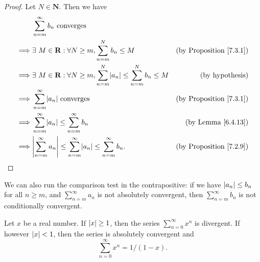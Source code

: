 \begin{proof}
    Let \(N \in \mathbf{N}\).
    Then we have
    \begin{align*}
                 & \sum_{n = m}^\infty b_n \text{ converges}                                                                                                    \\
        \implies & \exists\ M \in \mathbf{R} : \forall N \geq m, \sum_{n = m}^N b_n \leq M                                & \text{(by Proposition \ref{7.3.1})} \\
        \implies & \exists\ M \in \mathbf{R} : \forall N \geq m, \sum_{n = m}^N \abs*{a_n} \leq \sum_{n = m}^N b_n \leq M & \text{(by hypothesis)}              \\
        \implies & \sum_{n = m}^\infty \abs*{a_n} \text{ converges}                                                       & \text{(by Proposition \ref{7.3.1})} \\
        \implies & \sum_{n = m}^\infty \abs*{a_n} \leq \sum_{n = m}^\infty b_n                                            & \text{(by Lemma \ref{6.4.13})}      \\
        \implies & \abs*{\sum_{n = m}^\infty a_n} \leq \sum_{n = m}^\infty \abs*{a_n} \leq \sum_{n = m}^\infty b_n.       & \text{(by Proposition \ref{7.2.9})}
    \end{align*}
\end{proof}

\begin{note}
    We can also run the comparison test in the contrapositive:
    if we have \(\abs*{a_n} \leq b_n\) for all \(n \geq m\), and \(\sum_{n = m}^\infty a_n\) is not absolutely convergent, then \(\sum_{n = m}^\infty b_n\) is not conditionally convergent.
\end{note}

\begin{lemma}\label{7.3.3}
    Let \(x\) be a real number.
    If \(\abs*{x} \geq 1\), then the series \(\sum_{n = 0}^\infty x^n\) is divergent.
    If however \(\abs*{x} < 1\), then the series is absolutely convergent and
    \[
        \sum_{n = 0}^\infty x^n = 1 / (1 - x).
    \]
\end{lemma}

